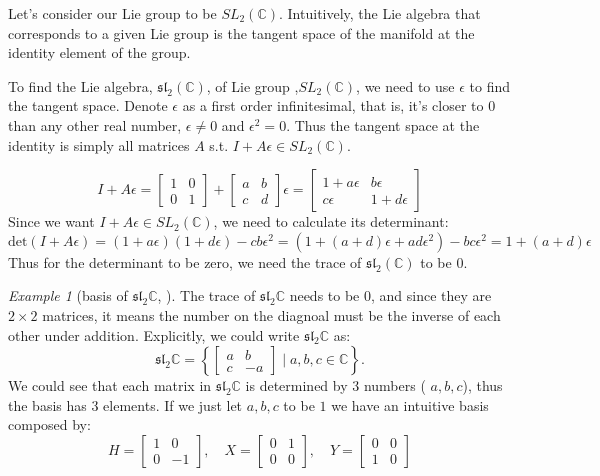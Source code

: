 \documentclass[a4paper]{article}
\newcommand{\C}{\mathbb{C}}
\theoremstyle{theorem} %
\theoremstyle{bfnote}                  %
\theoremstyle{example}                       %
\theoremstyle{remark}                       %
\newtheorem{exmp}[thm]{Example}  %
\numberwithin{equation}{section}
\begin{document}
\bigskip

Let's consider our Lie group to be $SL_2(\C)$. Intuitively, the Lie algebra that corresponds to a given Lie group is the tangent space of the manifold at the identity element of the group.

To find the Lie algebra, $\mathfrak{sl}_2(\C)$, of Lie group ,$SL_2(\C)$, we need to use  $\epsilon$ to find the tangent space. Denote $\epsilon$ as a first order infinitesimal, that is, it's closer to  $0$ than any other real number, $\epsilon \neq 0$ and $\epsilon^2 = 0$. Thus the tangent space at the identity is simply all matrices $A$ s.t.  $I+A\epsilon \in SL_2(\C)$.

\[
	I + A \epsilon = \begin{bmatrix} 1 & 0 \\ 0 & 1 \end{bmatrix} + \begin{bmatrix} a & b \\ c & d \end{bmatrix} \epsilon = \begin{bmatrix} 1+a \epsilon & b \epsilon \\ c \epsilon & 1+d \epsilon \end{bmatrix}  
\]
Since we want $I + A \epsilon \in SL_2(\C)$, we need to calculate its determinant: \[
	\text{det}(I + A \epsilon) = (1+a \epsilon)(1+d\epsilon) - c b \epsilon ^2 = (1 + (a+d)\epsilon + a d \epsilon^2) - b c \epsilon^2 = 1 + (a+d) \epsilon 
\]
Thus for the determinant to be zero, we need the trace of $\mathfrak{sl}_2(\C)$ to be  $0$.

\bigskip

\begin{exmp}[basis of $\mathfrak{sl}_2\C$, \citep{fulton_representation_2004}]
	The trace of $\mathfrak{sl}_2\C$ needs to be $0$, and since they are $2 \times 2$  matrices, it means the number on the diagnoal must be the inverse of each other under addition. Explicitly, we could write $\mathfrak{sl}_2\C$ as:  \[
		\mathfrak{sl}_2\C = \left\{ \begin{bmatrix} a & b \\
		c & -a\end{bmatrix} \mid a,b,c \in \C  \right\}. 
			\] We could see that each matrix in $\mathfrak{sl}_2\C$ is determined by  $3$ numbers ( $a,b,c$), thus the basis has  $3$ elements. If we just let  $a,b,c$ to be  $1$ we have an intuitive basis composed by:  \[
				H = \begin{bmatrix} 1 & 0 \\ 0 & -1 \end{bmatrix}, \quad X = \begin{bmatrix} 0 & 1 \\ 0 & 0 \end{bmatrix}, \quad Y = \begin{bmatrix} 0 & 0 \\ 1 & 0 \end{bmatrix}  
			\]  
\end{exmp}
\end{document}
